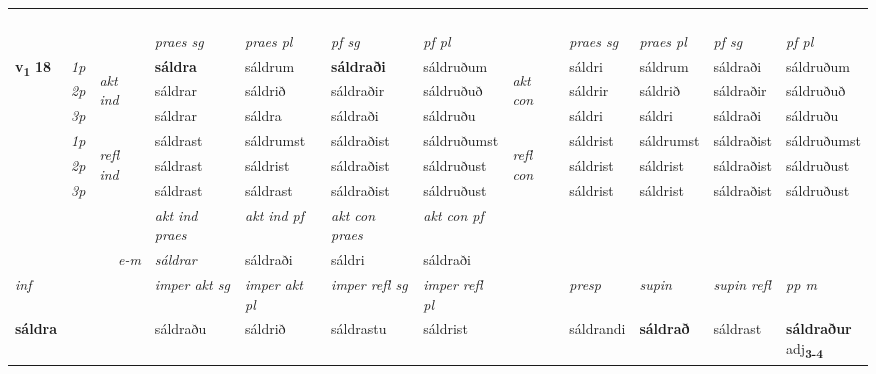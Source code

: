 \begin{longtable}[l]{X>{\footnotesize\itshape}llXXXXlXXXX}
\midrule
& \\*
 & \\*
   & \\*
  & \\
   \midrule
 & &   & \textit{praes sg}  & \textit{praes pl}    & \textit{ pf sg} & \textit{pf pl} & & \textit{praes sg}  & \textit{praes pl}    & \textit{pf sg} & \textit{pf pl }  \\ \cmidrule{4-7} \cmidrule{9-12}
 \multirow{2}{*}{{{\textbf{v{\textsubscript{1}}} \Large{\textbf{18}}}}}  & 1p & \multirow{3}{*}{\begin{turn}{90}\textit{akt ind}\end{turn}} & \textbf{sáldra} & sáldrum & \textbf{sáldraði} & sáldruðum & \multirow{3}{*}{\begin{turn}{90}\textit{akt con}\end{turn}} &sáldri & sáldrum & sáldraði & sáldruðum\\*
 & 2p &  &  sáldrar  & sáldrið & sáldraðir & sáldruðuð & & sáldrir & sáldrið & sáldraðir & sáldruðuð \\*
 & 3p &  & sáldrar & sáldra & sáldraði & sáldruðu & & sáldri & sáldri& sáldraði & sáldruðu \\*
\cmidrule{4-7} \cmidrule{9-12}
 & 1p & \multirow{3}{*}{\begin{turn}{90}\textit{refl ind}\end{turn}}  & sáldrast & sáldrumst & sáldraðist & sáldruðumst & \multirow{3}{*}{\begin{turn}{90}\textit{refl con}\end{turn}}  &sáldrist & sáldrumst & sáldraðist & sáldruðumst \\*
 & 2p &  & sáldrast & sáldrist & sáldraðist & sáldruðust & &sáldrist & sáldrist & sáldraðist & sáldruðust \\*
 & 3p  & & sáldrast & sáldrast & sáldraðist & sáldruðust & & sáldrist & sáldrist& sáldraðist & sáldruðust \\*
\cmidrule{4-7} \cmidrule{9-12}

   && &  \textit{akt ind praes} & \textit{akt ind pf} & \textit{akt con praes} & \textit{akt con pf} \\*
\multicolumn{3}{r}{\textit{e-m}} & sáldrar & sáldraði & sáldri & sáldraði \\*

\cmidrule{4-7}
   {\textit{inf}} & &  & \textit{imper akt sg} & \textit{imper akt pl} & \textit{imper refl sg} & \textit{imper refl pl} && \textit{presp} & \textit{supin} & \textit{supin refl} & \textit{pp m} \\*
  {\textbf{sáldra}} & && sáldraðu  & sáldrið & sáldrastu & sáldrist && sáldrandi &  \textbf{sáldrað} & sáldrast & \specialcell{\textbf{sáldraður} \\ adj\textbf{\textsubscript{3-4}}} \\*


\end{longtable}
